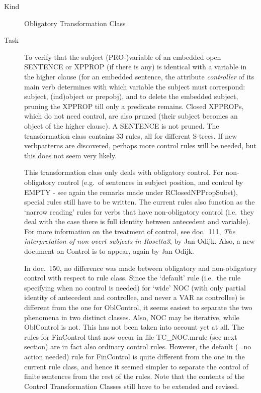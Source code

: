 \begin{description}
\item[Kind] Obligatory Transformation Class
\item[Task] To verify that the subject (PRO-)variable of an embedded 
open 
SENTENCE or XPPROP (if there is any) is identical with a variable in the higher
clause (for an embedded sentence, the attribute {\em controller\/} of its main 
verb determines with which 
variable the subject must correspond: subject, (ind)object or prepobj), 
and to delete the embedded subject, pruning the XPPROP till only a predicate 
remains.  Closed XPPROPs, which do not need control, are also pruned (their 
subject becomes an object of the higher clause). A SENTENCE is not pruned.
The transformation class contains 33 rules, all for different S-trees. If new 
verbpatterns are discovered, perhaps more control rules will be needed, but 
this does not seem very likely.

This transformation class only deals with obligatory control. For 
non-obligatory control (e.g.\ of sentences in subject position, and control by 
EMPTY - see again the remarks made under RClosedNPPropSubst), special rules 
still have to be written. The current rules also function as the `narrow 
reading' rules 
for verbs that have non-obligatory control 
(i.e.\ they deal with the case there is full identity between antecedent and 
variable). For more 
information on the treatment of control, see doc.\ 111, 
{\em The interpretation of non-overt subjects in Rosetta3\/}, by Jan Odijk. 
Also, a new document on Control is to appear, again by Jan Odijk.

In doc.\ 150, no difference was made between obligatory 
and non-obligatory control with respect to rule class. Since the `default' rule
(i.e.\ the rule specifying when no control is needed) 
for `wide' NOC (with only partial identity of antecedent and controllee, and 
never a VAR as controllee) is different from the one for OblControl, it seems 
easiest to separate the two phenomena in two distinct classes. Also, NOC may be 
iterative, while OblControl is not. This has not been taken into account yet at 
all. The rules for FinControl that now occur in file TC\_NOC.mrule 
(see next section) are in 
fact also ordinary control rules. However, the default (=no action needed) rule 
for FinControl is 
quite different from the one in the current rule class, and hence it seemed 
simpler to separate the control of finite sentences from the rest of the rules.
Note that the contents of the Control Transformation Classes still have to be 
extended and revised.


\end{description}
